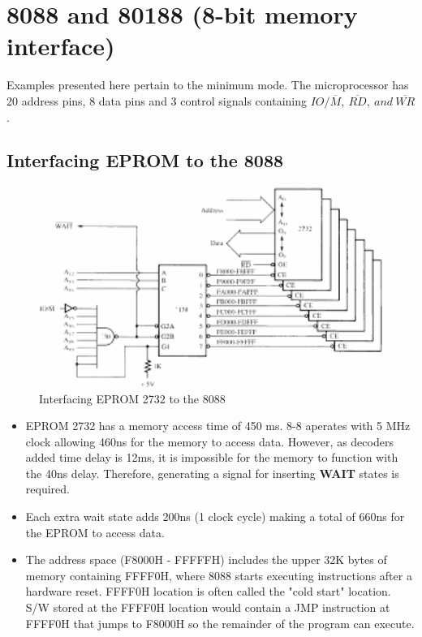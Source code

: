 \section{8088 and 80188 (8-bit memory interface)}
Examples presented here pertain to the minimum mode. The microprocessor has 20 address pins, 8 data pins and 3 control signals containing $IO/\overline{M},~\overline{RD},~and~\overline{WR}$.
\subsection{Interfacing EPROM to the 8088}

\begin{figure}[h!]
  \includegraphics[width = 1\textwidth]{./figures/EPROM_2732.png}
  \caption{Interfacing EPROM 2732 to the 8088}
\end{figure}
\begin{itemize}
  \item EPROM 2732 has a memory access time of 450 ms. 8-8 aperates with 5 MHz clock allowing 460ns for the memory to access data. However, as decoders added time delay is 12ms, it is impossible for the memory to function with the 40ns delay. Therefore, generating a signal for inserting \textbf{WAIT} states is required.
  \item Each extra wait state adds 200ns (1 clock cycle) making a total of 660ns for the EPROM to access data.
  \item The address space (F8000H - FFFFFH) includes the upper 32K bytes of memory containing FFFF0H, where 8088 starts executing instructions after a hardware reset. FFFF0H location is often called the "cold start" location. S/W stored at the FFFF0H location would contain a JMP instruction at FFFF0H that jumps to F8000H so the remainder of the program can execute.
\end{itemize}


